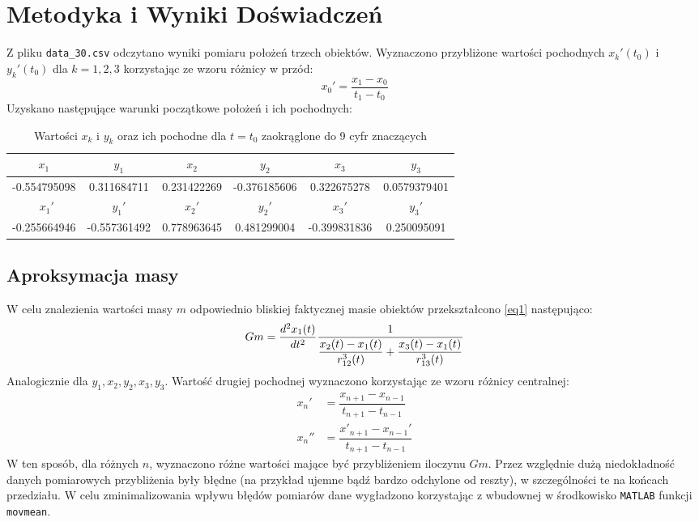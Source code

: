 \documentclass[a4paper, 12pt, twoside, openany]{article}
\begin{document}
	
	\section{Metodyka i Wyniki Doświadczeń}
	
	Z pliku \texttt{data\_30.csv} odczytano wyniki pomiaru położeń trzech obiektów. Wyznaczono przybliżone wartości pochodnych $x_k'(t_0)$ i $y_k'(t_0)$ dla $k = 1,2,3$ korzystając ze wzoru różnicy w przód:
	$$ x_0' = \dfrac{x_1 - x_0}{t_1 - t_0} $$
	Uzyskano następujące warunki początkowe położeń i ich pochodnych: 
	\begin{table}[H]
		\centering
		\begin{tabular}{|c|c|c|c|c|c|}
			\hline
			$x_1$ & $y_1$ & $x_2$ & $y_2$ & $x_3$ & $y_3$ \\
			\hline
			-0.554795098 & 0.311684711 & 0.231422269 & -0.376185606 & 0.322675278 & 0.0579379401 \\
			\hline\
			$x_1'$ & $y_1'$ & $x_2'$ & $y_2'$ & $x_3'$ & $y_3'$ \\
			\hline
			-0.255664946 & -0.557361492 & 0.778963645 & 0.481299004 & -0.399831836 & 0.250095091 \\
			\hline
		\end{tabular}
		\caption{Wartości $x_k$ i $y_k$ oraz ich pochodne dla $t = t_0$ zaokrąglone do 9 cyfr znaczących}
	\end{table}
	
	\subsection{Aproksymacja masy}  
	W celu znalezienia wartości masy $m$ odpowiednio bliskiej faktycznej masie obiektów przekształcono \eqref{eq1} następująco:
	$$			
	Gm = \dfrac{d^2x_1(t)}{dt^2} \dfrac{1}{ \dfrac{x_2(t) - x_1(t)}{r^3_{12}(t)} + \dfrac{x_3(t) - x_1(t)}{r^3_{13}(t)}} \\
	$$
	Analogicznie dla $y_1,x_2,y_2,x_3,y_3$. Wartość drugiej pochodnej wyznaczono korzystając ze wzoru różnicy centralnej:
	$$
	\begin{aligned}
		x_n'  &= \dfrac{x_{n+1} - x_{n-1}}{t_{n+1} - t_{n-1}} \\
		x_n'' &= \dfrac{x'_{n+1} - x_{n-1}'}{t_{n+1} - t_{n-1}} 
	\end{aligned}
	$$
	W ten sposób, dla różnych $n$, wyznaczono różne wartości mające być przybliżeniem iloczynu $Gm$.
	Przez względnie dużą niedokładność danych pomiarowych przybliżenia były błędne (na przykład ujemne bądź bardzo odchylone od reszty), w szczególności te na końcach przedziału. W celu zminimalizowania wpływu błędów pomiarów dane wygładzono korzystając z wbudownej w środkowisko \texttt{MATLAB} funkcji \texttt{movmean}.
	
\end{document}
